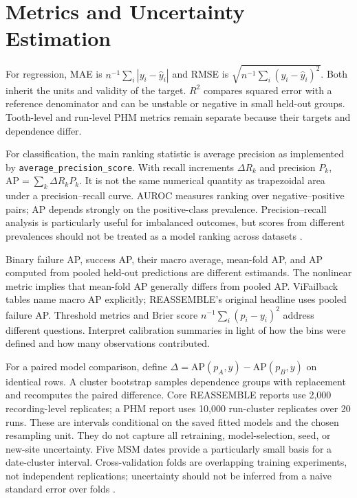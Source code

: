 \section{Metrics and Uncertainty Estimation}
For regression, MAE is $n^{-1}\sum_i|y_i-\hat y_i|$ and RMSE is $\sqrt{n^{-1}\sum_i(y_i-\hat y_i)^2}$. Both inherit the units and validity of the target. $R^2$ compares squared error with a reference denominator and can be unstable or negative in small held-out groups. Tooth-level and run-level PHM metrics remain separate because their targets and dependence differ.

For classification, the main ranking statistic is average precision as implemented by \texttt{average\_precision\_score}. With recall increments $\Delta R_k$ and precision $P_k$, $\mathrm{AP}=\sum_k\Delta R_kP_k$. It is not the same numerical quantity as trapezoidal area under a precision--recall curve. AUROC measures ranking over negative--positive pairs; AP depends strongly on the positive-class prevalence. Precision--recall analysis is particularly useful for imbalanced outcomes, but scores from different prevalences should not be treated as a model ranking across datasets \citep{Saito2015PrecisionRecall}.

Binary failure AP, success AP, their macro average, mean-fold AP, and AP computed from pooled held-out predictions are different estimands. The nonlinear metric implies that mean-fold AP generally differs from pooled AP. ViFailback tables name macro AP explicitly; REASSEMBLE's original headline uses pooled failure AP. Threshold metrics and Brier score $n^{-1}\sum_i(p_i-y_i)^2$ address different questions. Interpret calibration summaries in light of how the bins were defined and how many observations contributed.

For a paired model comparison, define $\Delta=\mathrm{AP}(p_A,y)-\mathrm{AP}(p_B,y)$ on identical rows. A cluster bootstrap samples dependence groups with replacement and recomputes the paired difference. Core REASSEMBLE reports use 2,000 recording-level replicates; a PHM report uses 10,000 run-cluster replicates over 20 runs. These are intervals conditional on the saved fitted models and the chosen resampling unit. They do not capture all retraining, model-selection, seed, or new-site uncertainty. Five MSM dates provide a particularly small basis for a date-cluster interval. Cross-validation folds are overlapping training experiments, not independent replications; uncertainty should not be inferred from a naive standard error over folds \citep{Bengio2004CVVariance}.

